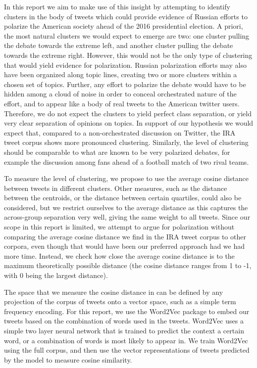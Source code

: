 \documentclass[12pt, authoryear]{elsarticle}
\begin{document}
In this report we aim to make use of this insight by attempting to identify clusters in the body of tweets which could provide evidence of Russian efforts to polarize the American society ahead of the 2016 presidential election. A priori, the most natural clusters we would expect to emerge are two: one cluster pulling the debate towards the extreme left, and another cluster pulling the debate towards the extreme right. However, this would not be the only type of clustering that would yield evidence for polarization. Russian polarization efforts may also have been organized along topic lines, creating two or more clusters within a chosen set of topics. Further, any effort to polarize the debate would have to be hidden among a cloud of noise in order to conceal orchestrated nature of the effort, and to appear like a body of real tweets to the American twitter users. Therefore, we do not expect the clusters to yield perfect class separation, or yield very clear separation of opinions on topics. In support of our hypothesis we would expect that, compared to a non-orchestrated discussion on Twitter, the IRA tweet corpus shows more pronounced clustering. Similarly, the level of clustering should be comparable to what are known to be very polarized debates, for example the discussion among fans ahead of a football match of two rival teams.

To measure the level of clustering, we propose to use the average cosine distance between tweets in different clusters. Other measures, such as the distance between the centroids, or the distance between certain quartiles, could also be considered, but we restrict ourselves to the average distance as this captures the across-group separation very well, giving the same weight to all tweets. Since our scope in this report is limited, we attempt to argue for polarization without comparing the average cosine distance we find in the IRA tweet corpus to other corpora, even though that would have been our preferred approach had we had more time. Instead, we check how close the average cosine distance is to the maximum theoretically possible distance (the cosine distance ranges from 1 to -1, with 0 being the largest distance).

The space that we measure the cosine distance in can be defined by any projection of the corpus of tweets onto a vector space, such as a simple term frequency encoding. For this report, we use the Word2Vec package to embed our tweets based on the combination of words used in the tweets. Word2Vec uses a simple two layer neural network that is trained to predict the context a certain word, or a combination of words is most likely to appear in. We train Word2Vec using the full corpus, and then use the vector representations of tweets predicted by the model to measure cosine similarity.
\end{document}
